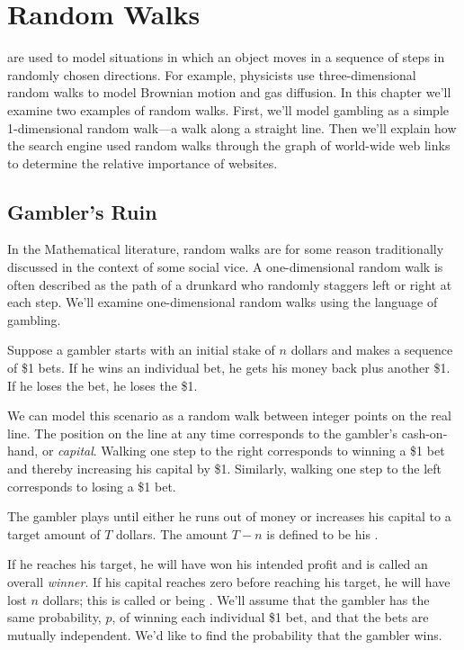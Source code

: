 \newcommand{\PRnk}{\operatorname{Rank}}


\chapter{Random Walks}\label{ran_process_chap}

 are used to model situations in which an object
moves in a sequence of steps in randomly chosen directions.  For
example, physicists use three-dimensional random walks to model
Brownian motion and gas diffusion.  In this chapter we'll examine two
examples of random walks.  First, we'll model gambling as a simple
1-dimensional random walk---a walk along a straight line.  Then we'll
explain how the  search engine used random walks through
the graph of world-wide web links to determine the relative importance
of websites.

\section{Gambler's Ruin}

\begin{editingnotes}
In the Mathematical literature, random walks are for some reason
traditionally discussed in the context of some social vice.  A
one-dimensional random walk is often described as the path of a drunkard
who randomly staggers left or right at each step.  We'll examine
one-dimensional random walks using the language of gambling.
\end{editingnotes}

Suppose a gambler starts with an initial stake of $n$ dollars and
makes a sequence of \$1 bets.  If he wins an individual bet, he gets
his money back plus another \$1.  If he loses the bet, he loses the
\$1.

We can model this scenario as a random walk between integer points on
the real line.  The position on the line at any time corresponds to
the gambler's cash-on-hand, or \emph{capital}.  Walking one step to the
right corresponds to winning a \$1 bet and thereby increasing his
capital by \$1.  Similarly, walking one step to the left corresponds
to losing a \$1 bet.

The gambler plays until either he runs out of money or increases
his capital to a target amount of $T$ dollars.  The amount $T-n$ is
defined to be his .

If he reaches his target, he will have won his intended profit and is
called an overall \emph{winner}.  If his capital reaches zero before
reaching his target, he will have lost $n$ dollars; this is called
 or being .  We'll assume that the
gambler has the same probability, $p$, of winning each individual \$1
bet, and that the bets are mutually independent.  We'd like to find
the probability that the gambler wins.

